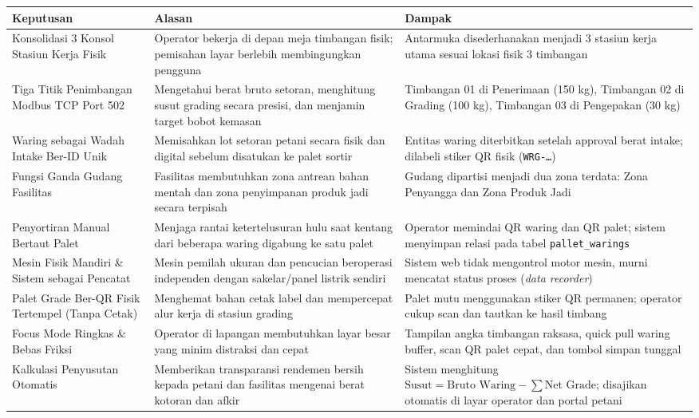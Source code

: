\documentclass[12pt,a4paper]{article}
\begin{document}
\begin{longtable}{@{}>{\raggedright\arraybackslash}p{4.6cm}>{\raggedright\arraybackslash}p{6.2cm}>{\raggedright\arraybackslash}p{4.6cm}@{}}
\toprule
\textbf{Keputusan} & \textbf{Alasan} & \textbf{Dampak} \\
\midrule
\endhead
Konsolidasi 3 Konsol Stasiun Kerja Fisik & Operator bekerja di depan meja timbangan fisik; pemisahan layar berlebih membingungkan pengguna & Antarmuka disederhanakan menjadi 3 stasiun kerja utama sesuai lokasi fisik 3 timbangan \\
\hline
Tiga Titik Penimbangan Modbus TCP Port 502 & Mengetahui berat bruto setoran, menghitung susut grading secara presisi, dan menjamin target bobot kemasan & Timbangan 01 di Penerimaan (150 kg), Timbangan 02 di Grading (100 kg), Timbangan 03 di Pengepakan (30 kg) \\
\hline
Waring sebagai Wadah Intake Ber-ID Unik & Memisahkan lot setoran petani secara fisik dan digital sebelum disatukan ke palet sortir & Entitas waring diterbitkan setelah approval berat intake; dilabeli stiker QR fisik (\texttt{WRG-\ldots}) \\
\hline
Fungsi Ganda Gudang Fasilitas & Fasilitas membutuhkan zona antrean bahan mentah dan zona penyimpanan produk jadi secara terpisah & Gudang dipartisi menjadi dua zona terdata: Zona Penyangga dan Zona Produk Jadi \\
\hline
Penyortiran Manual Bertaut Palet & Menjaga rantai ketertelusuran hulu saat kentang dari beberapa waring digabung ke satu palet & Operator memindai QR waring dan QR palet; sistem menyimpan relasi pada tabel \texttt{pallet\_warings} \\
\hline
Mesin Fisik Mandiri \& Sistem sebagai Pencatat & Mesin pemilah ukuran dan pencucian beroperasi independen dengan sakelar/panel listrik sendiri & Sistem web tidak mengontrol motor mesin, murni mencatat status proses (\emph{data recorder}) \\
\hline
Palet Grade Ber-QR Fisik Tertempel (Tanpa Cetak) & Menghemat bahan cetak label dan mempercepat alur kerja di stasiun grading & Palet mutu menggunakan stiker QR permanen; operator cukup scan dan tautkan ke hasil timbang \\
\hline
Focus Mode Ringkas \& Bebas Friksi & Operator di lapangan membutuhkan layar besar yang minim distraksi dan cepat & Tampilan angka timbangan raksasa, quick pull waring buffer, scan QR palet cepat, dan tombol simpan tunggal \\
\hline
Kalkulasi Penyusutan Otomatis & Memberikan transparansi rendemen bersih kepada petani dan fasilitas mengenai berat kotoran dan afkir & Sistem menghitung $\text{Susut} = \text{Bruto Waring} - \sum \text{Net Grade}$; disajikan otomatis di layar operator dan portal petani \\

\end{longtable}
\end{document}

